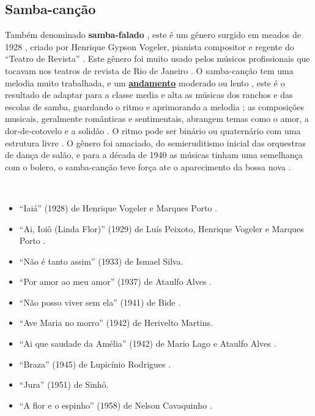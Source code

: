 \subsection{Samba-canção}
Também denominado \textbf{samba-falado} \cite[pp. 63]{reinato2010musica},
este é um gênero surgido em meados de 1928 \cite[pp. 63]{reinato2010musica} \cite[pp. 291]{dourado2004dicionario},
criado por Henrique Gypson Vogeler, pianista compositor e regente do ``Teatro de Revista'' \cite[pp. 63]{reinato2010musica}. 
Este gênero foi muito usado pelos músicos profissionais que tocavam nos teatros de revista de Rio de Janeiro \cite[pp. 291]{dourado2004dicionario}.
O samba-canção tem uma melodia muito trabalhada, 
e um \hyperref[sec:Andamento]{\textbf{andamento}} moderado \cite[pp. 291]{dourado2004dicionario} ou lento \cite[pp. 63]{reinato2010musica}, 
este é o resultado de adaptar para a classe media e alta as músicas dos ranchos e das escolas de samba, 
guardando o ritmo e aprimorando a melodia \cite[pp. 4]{musicasambavariasdef1} \cite[pp. 128]{perna2002samba}; 
as composições musicais, geralmente românticas e sentimentais, abrangem temas como o amor, a dor-de-cotovelo e a solidão \cite{subgenerosdosamba2} \cite[pp. 291]{dourado2004dicionario}.
O ritmo pode ser binário ou quaternário com uma estrutura livre \cite[pp. 63]{reinato2010musica}.
O gênero foi amaciado, do semieruditismo inicial das orquestras de dança de salão, 
e para a década de 1940 as músicas tinham uma semelhança com o bolero,
o samba-canção teve força ate o aparecimento da bossa nova \cite[pp. 128]{perna2002samba}.
\begin{example} ~

\begin{itemize}
\item ``Iaiá'' (1928) de Henrique Vogeler e Marques Porto \cite[pp. 684,999]{marcondes1977enciclopediav2} \cite[pp. 63]{reinato2010musica}.
\item ``Ai, Ioiô (Linda Flor)'' (1929) de Luís Peixoto, Henrique Vogeler e Marques Porto \cite[pp. 684,899]{marcondes1977enciclopediav2} \cite[pp. 128]{perna2002samba} \cite[pp. 291]{dourado2004dicionario}.

\item ``Não é tanto assim'' (1933) de Ismael Silva\cite{subgenerosdosamba2}.
\item ``Por amor ao meu amor'' (1937) de Ataulfo Alves  \cite{subgenerosdosamba2}.
\item ``Não posso viver sem ela'' (1941) de Bide \cite{subgenerosdosamba2}.
\item ``Ave Maria no morro'' (1942) de Herivelto Martins\cite{subgenerosdosamba2}.
\item ``Ai que saudade da Amélia'' (1942) de Mario Lago e Ataulfo Alves \cite{subgenerosdosamba2}.
\item ``Braza'' (1945) de Lupicínio Rodrigues \cite{subgenerosdosamba2}.
\item ``Jura'' (1951) de Sinhô\cite{subgenerosdosamba2}.
\item ``A flor e o espinho'' (1958) de Nelson Cavaquinho \cite{subgenerosdosamba2}.
\end{itemize}
\end{example}


